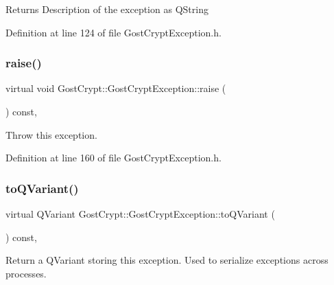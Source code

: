 \begin{DoxyReturn}{Returns}
Description of the exception as Q\+String 
\end{DoxyReturn}


Definition at line 124 of file Gost\+Crypt\+Exception.\+h.

\mbox{\label{class_gost_crypt_1_1_gost_crypt_exception_ae3aef8384d1d66dacb66ac5684bb4694}} 
\subsubsection{\texorpdfstring{raise()}{raise()}}
{\footnotesize\ttfamily virtual void Gost\+Crypt\+::\+Gost\+Crypt\+Exception\+::raise (\begin{DoxyParamCaption}{ }\end{DoxyParamCaption}) const\hspace{0.3cm}{\ttfamily [inline]}, {\ttfamily [virtual]}}



Throw this exception. 



Definition at line 160 of file Gost\+Crypt\+Exception.\+h.

\mbox{\label{class_gost_crypt_1_1_gost_crypt_exception_a657b09e56315556e82ad56b4a38673d2}} 
\subsubsection{\texorpdfstring{to\+Q\+Variant()}{toQVariant()}}
{\footnotesize\ttfamily virtual Q\+Variant Gost\+Crypt\+::\+Gost\+Crypt\+Exception\+::to\+Q\+Variant (\begin{DoxyParamCaption}{ }\end{DoxyParamCaption}) const\hspace{0.3cm}{\ttfamily [inline]}, {\ttfamily [virtual]}}



Return a Q\+Variant storing this exception. Used to serialize exceptions across processes. 


